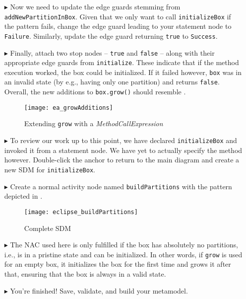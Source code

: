 \begin{itemize}
\clearpage

\item[$\blacktriangleright$] Now we need to update the edge guards stemming from \texttt{add\-New\-Part\-ition\-In\-Box}. Given that we only want to call
\texttt{initializeBox} if the pattern fails, change the edge guard leading to your statement node to \texttt{Failure}. Similarly, update the edge guard
returning \texttt{true} to \texttt{Success}.

\item[$\blacktriangleright$] Finally, attach two stop nodes -- \texttt{true} and \texttt{false} -- along with their appropriate edge guards from
\texttt{initialize}. These indicate that if the method execution worked, the box could be initialized. If it failed however, \texttt{box} was
in an invalid state (by e.g., having only one partition) and returns \texttt{false}. Overall, the new additions to \texttt{box.grow()} should resemble
.

\vspace{0.5cm}

\begin{figure}[htp]
\begin{center}
  \texttt{[image: ea\_growAdditions]}
  \caption{Extending \texttt{grow} with a \emph{MethodCallExpression}}
  \label{ea:newGrowControl}
\end{center}
\end{figure}

\item[$\blacktriangleright$] To review our work up to this point, we have declared \texttt{initializeBox} and invoked it from a statement node. We have yet
to actually specify the method however. Double-click the anchor to return to the main diagram and create a new SDM
for \texttt{initializeBox}.

\item[$\blacktriangleright$] Create a normal activity node named \texttt{buildPartitions} with the pattern depicted in .

\newpage
 
\begin{figure}[htp]
\begin{center}
  \texttt{[image: eclipse\_buildPartitions]}
  \caption{Complete SDM}
  \label{ea:buildPartitions}
\end{center}
\end{figure}
 
\item[$\blacktriangleright$] The NAC used here is only fulfilled if the box has absolutely no partitions, i.e., is in a pristine state and can be
initialized. In other words, if \texttt{grow} is used for an empty box, it initializes the box for the first time and grows it after that, ensuring that the box
is always in a valid state.
 
\item[$\blacktriangleright$] You're finished! Save, validate, and build your metamodel.

\end{itemize}
